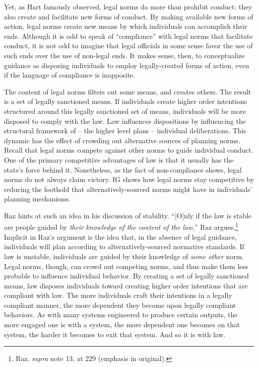 Yet, as Hart famously observed, legal norms do more than prohibit
conduct: they also create and facilitate new forms of conduct. By making
available new forms of action, legal norms create new means by which
individuals can accomplish their ends. Although it is odd to speak of
``compliance'' with legal norms that facilitate conduct, it is not odd
to imagine that legal officials in some sense favor the use of such ends
over the use of non-legal ends. It makes sense, then, to conceptualize
guidance as disposing individuals to employ legally-created forms of
action, even if the language of compliance is inapposite.

The content of legal norms filters out some means, and creates others.
The result is a set of legally sanctioned means. If individuals create
higher order intentions structured around this legally sanctioned set of
means, individuals will be more disposed to comply with the law. Law
influences dispositions by influencing the structural framework of --
the higher level plans -- individual deliberations. This dynamic has the
effect of crowding out alternative sources of planning norms. Recall
that legal norms compete against other norms to guide individual
conduct. One of the primary competitive advantages of law is that it
usually has the state's force behind it. Nonetheless, as the fact of
non-compliance shows, legal norms do not always claim victory. IG shows
how legal norms stay competitive by reducing the foothold that
alternatively-sourced norms might have in individuals' planning
mechanisms.

Raz hints at such an idea in his discussion of stability. ``{[}O{]}nly
if the law is stable are people guided by \emph{their knowledge of the
content of the law},'' Raz argues.\footnote{Raz, \emph{supra} note 13,
  at 229 (emphasis in original).} Implicit in Raz's argument is the idea
that, in the absence of legal guidance, individuals will plan according
to alternatively-sourced normative standards. If law is unstable,
individuals are guided by their knowledge of \emph{some other} norm.
Legal norms, though, can crowd out competing norms, and thus make them
less probable to influence individual behavior. By creating a set of
legally sanctioned means, law disposes individuals toward creating
higher order intentions that are compliant with law. The more
individuals craft their intentions in a legally compliant manner, the
more dependent they become upon legally compliant behaviors. As with
many systems engineered to produce certain outputs, the more engaged one
is with a system, the more dependent one becomes on that system, the
harder it becomes to exit that system. And so it is with law.


